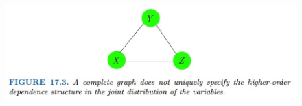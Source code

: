 \documentclass{article}
\begin{document}
\begin{enumerate}
\begin{figure}[h]
\includegraphics[width=.95\textwidth]{ESM_Fig_17_3.jpg}
\end{figure}



\end{enumerate}
\end{document}
